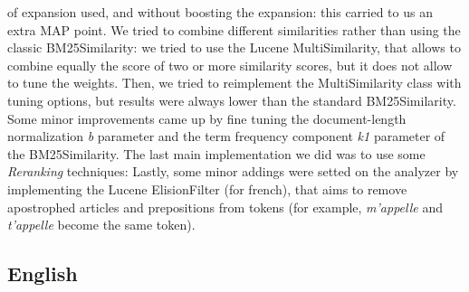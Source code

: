 of expansion used, and without boosting the expansion: this carried to us an extra MAP point.
We tried to combine different similarities rather than using the classic BM25Similarity: we tried to use the Lucene MultiSimilarity, that allows to combine equally the score of two or more similarity scores, but it does not allow to
tune the weights. Then, we tried to reimplement the MultiSimilarity class with tuning options, but results were always lower than the standard BM25Similarity. Some minor improvements came up by fine tuning the document-length
normalization \textit{b} parameter and the term frequency component \textit{k1} parameter of the BM25Similarity.
The last main implementation we did was to use some \textit{Reranking} techniques:  
Lastly, some minor addings were setted on the analyzer by implementing the Lucene ElisionFilter (for french), that aims to remove apostrophed articles and prepositions from tokens (for example, \textit{m'appelle} and \textit{t'appelle} become the same token).



\subsection{English}
